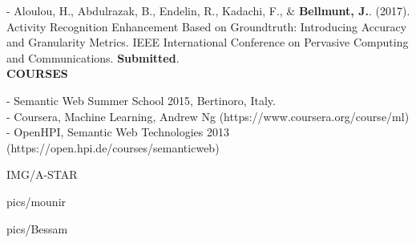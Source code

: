 \documentclass[paper=a4,fontsize=11pt]{temp} %
\begin{document}
\begin{minipage}{0.88\linewidth}
    - Aloulou, H., Abdulrazak, B., Endelin, R., Kadachi, F., \& \textbf{Bellmunt, J.}. (2017). Activity Recognition Enhancement Based on Groundtruth: Introducing Accuracy and Granularity Metrics. IEEE
International Conference on Pervasive Computing and Communications. \textbf{Submitted}.\\

\textbf{\textcolor{redCV}{COURSES}}
\vspace{1ex}

- Semantic Web Summer School 2015, Bertinoro, Italy.\\
- Coursera, Machine Learning, Andrew Ng (https://www.coursera.org/course/ml) \\
- OpenHPI, Semantic Web Technologies 2013 (https://open.hpi.de/courses/semanticweb)
 \end{minipage} 


\sepspace

\hspace{3mm}
\begin{minipage}[t]{0.88\textwidth}
 {IMG/A-STAR}
\end{minipage}

\sepspace

\hspace{3mm}
\begin{minipage}[t]{0.45\textwidth}
 {pics/mounir}
\end{minipage}
\hspace{0.02\textwidth}
\begin{minipage}[t]{0.45\textwidth}
 {pics/Bessam}
\end{minipage}
 \sepspace
 


\end{document}
